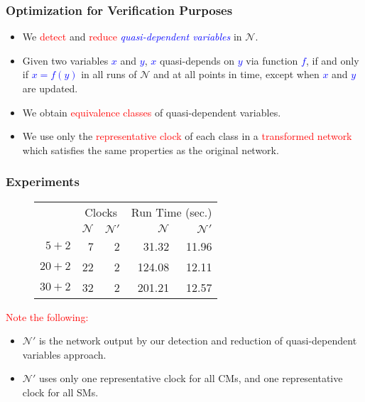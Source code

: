 \documentclass[serif]{beamer}
\begin{document}
\begin{frame}\frametitle{\textbf{Optimization for Verification Purposes}}
\begin{itemize}
	\item We \textcolor{red}{detect} and \textcolor{red}{reduce} 
				\emph{\textcolor{blue}{quasi-dependent variables}} in $\mathcal{N}$.
	\item Given two variables \textcolor{blue}{$x$} and \textcolor{blue}{$y$}, \textcolor{blue}{$x$} quasi-depends
on \textcolor{blue}{$y$} via function \textcolor{blue}{$f$}, if and only if \textcolor{blue}{$x=f(y)$} in all 
runs of $\mathcal{N}$ and at all points in time, except when \textcolor{blue}{$x$} and \textcolor{blue}{$y$} are updated.
	\item We obtain \textcolor{red}{equivalence classes} of quasi-dependent variables. 
	\item We use only the \textcolor{red}{representative clock} of each class in a 
				\textcolor{red}{transformed network} which satisfies the same properties as
				the original network.
\end{itemize}
\end{frame} 

\begin{frame}\frametitle{\textbf{Experiments}}
\begin{center}
\begin{figure} 
\begin{table}[t]%
  \centering
  \begin{tabular}[b]{|r||r|r||r|r|}
    \hline
    \multirow{2}{*}{} &
    \multicolumn{2}{|c||}{\scriptsize Clocks}  & 
    \multicolumn{2}{|c|}{\scriptsize Run Time (sec.)} 
    \\ 
    \scriptsize Components
    &\scriptsize $\mathcal{N}$ &\scriptsize $\mathcal{N}'$  
    &\scriptsize $\mathcal{N}$ &\scriptsize $\mathcal{N}'$ 
    \\    \hline\hline 
    \scriptsize $5 + 2$ & \scriptsize 7 & \scriptsize 2 &\scriptsize 31.32 
    &\scriptsize 11.96
    \\    \hline 
    \scriptsize $20 + 2$ & \scriptsize 22 & \scriptsize 2  &\scriptsize 124.08&\scriptsize 12.11
    \\    \hline 
    \scriptsize $30 + 2$ & \scriptsize 32 &\scriptsize 2 &\scriptsize 201.21 &\scriptsize 12.57
    \\    \hline 
  \end{tabular}
\end{table}%
\end{figure} 
\end{center}

\textcolor{red}{Note the following:} 
\begin{itemize}
	\item $\mathcal{N}'$ is the network output by our detection and reduction of quasi-dependent variables approach.
	\item $\mathcal{N}'$ uses only one representative clock for all CMs, and one representative clock for all SMs.
\end{itemize}  
\end{frame}
 
\end{document}
